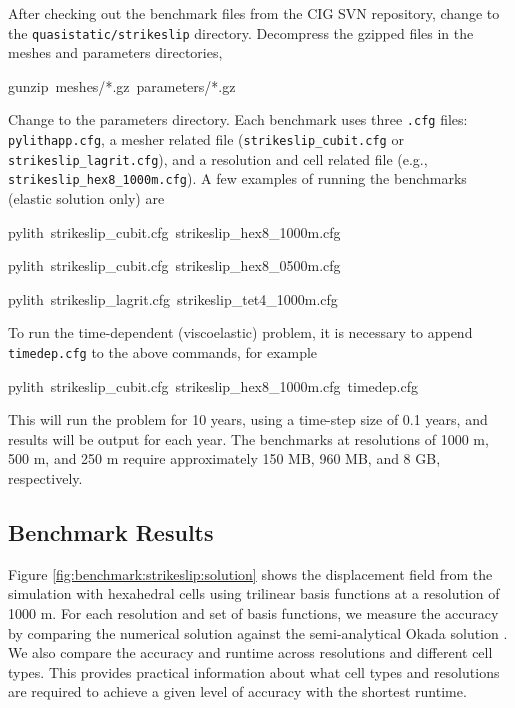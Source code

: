 After checking out the benchmark files from the CIG SVN repository,
change to the \texttt{quasistatic/strikeslip} directory. Decompress
the gzipped files in the meshes and parameters directories,
\begin{lyxcode}
gunzip~meshes/{*}.gz~parameters/{*}.gz
\end{lyxcode}
Change to the parameters directory. Each benchmark uses three \texttt{.cfg}
files: \texttt{pylithapp.cfg}, a mesher related file (\texttt{strikeslip\_cubit.cfg}
or \texttt{strikeslip\_lagrit.cfg}), and a resolution and cell related
file (e.g., \texttt{strikeslip\_hex8\_1000m.cfg}). A few examples
of running the benchmarks (elastic solution only) are
\begin{lyxcode}
pylith~strikeslip\_cubit.cfg~strikeslip\_hex8\_1000m.cfg

pylith~strikeslip\_cubit.cfg~strikeslip\_hex8\_0500m.cfg

pylith~strikeslip\_lagrit.cfg~strikeslip\_tet4\_1000m.cfg
\end{lyxcode}
To run the time-dependent (viscoelastic) problem, it is necessary
to append \texttt{timedep.cfg} to the above commands, for example
\begin{lyxcode}
pylith~strikeslip\_cubit.cfg~strikeslip\_hex8\_1000m.cfg~timedep.cfg
\end{lyxcode}
This will run the problem for 10 years, using a time-step size of
0.1 years, and results will be output for each year. The benchmarks
at resolutions of 1000 m, 500 m, and 250 m require  approximately
150 MB, 960 MB, and 8 GB, respectively.


\subsection{Benchmark Results}

Figure \ref{fig:benchmark:strikeslip:solution} shows the displacement
field from the simulation with hexahedral cells using trilinear basis
functions at a resolution of 1000 m. For each resolution and set of
basis functions, we measure the accuracy by comparing the numerical
solution against the semi-analytical Okada solution \cite{Okada:1992}.
We also compare the accuracy and runtime across resolutions and different
cell types. This provides practical information about what cell types
and resolutions are required to achieve a given level of accuracy
with the shortest runtime.

